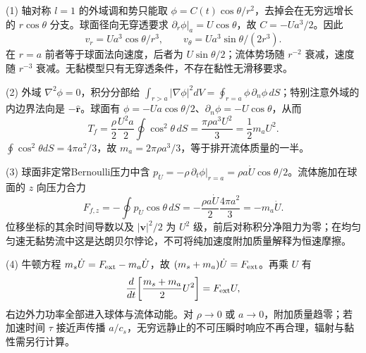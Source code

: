 (1) 轴对称 \(l=1\) 的外域调和势只能取 \(\phi=C(t)\cos\theta/r^2\)，去掉会在无穷远增长的 \(r\cos\theta\) 分支。球面径向无穿透要求 \(\partial_r\phi|_{a}=U\cos\theta\)，故 \(C=-Ua^3/2\)。因此
\[
v_r=Ua^3\cos\theta/r^3,\qquad v_\theta=Ua^3\sin\theta/(2r^3).
\]
在 \(r=a\) 前者等于球面法向速度，后者为 \(U\sin\theta/2\)；流体势场随 \(r^{-2}\) 衰减，速度随 \(r^{-3}\) 衰减。无黏模型只有无穿透条件，不存在黏性无滑移要求。

(2) 外域 \(\nabla^2\phi=0\)，积分分部给
\(\int_{r>a}|\nabla\phi|^2dV=\oint_{r=a}\phi\,\partial_n\phi\,dS\)；特别注意外域的内边界法向是 \(-\hat{\boldsymbol r}\)。球面有 \(\phi=-Ua\cos\theta/2\)、\(\partial_n\phi=-U\cos\theta\)，从而
\[
T_f=\frac\rho2\frac{U^2a}{2}\oint\cos^2\theta\,dS
=\frac{\pi\rho a^3U^2}{3}=\frac12m_aU^2.
\]
\(\oint\cos^2\theta dS=4\pi a^2/3\)，故 \(\boxed{m_a=2\pi\rho a^3/3}\)，等于排开流体质量的一半。

(3) 球面非定常Bernoulli压力中含 \(p_{\dot U}=-\rho\,\partial_t\phi|_{r=a}=\rho a\dot U\cos\theta/2\)。流体施加在球面的 \(z\) 向压力合力
\[
F_{f,z}=-\oint p_{\dot U}\cos\theta\,dS
=-\frac{\rho a\dot U}{2}\frac{4\pi a^2}{3}
=\boxed{-m_a\dot U}.
\]
位移坐标的其余时间导数以及 \(|\boldsymbol v|^2/2\) 为 \(U^2\) 级，前后对称积分净阻力为零；在均匀匀速无黏势流中这是达朗贝尔悖论，不可将纯加速度附加质量解释为恒速摩擦。

(4) 牛顿方程 \(m_s\dot U=F_{\rm ext}-m_a\dot U\)，故 \((m_s+m_a)\dot U=F_{\rm ext}\)。再乘 \(U\) 有
\[
\frac{d}{dt}\!\left[\frac{m_s+m_a}{2}U^2\right]=F_{\rm ext}U ,
\]
右边外力功率全部进入球体与流体动能。对 \(\rho\to0\) 或 \(a\to0\)，附加质量趋零；若加速时间 \(\tau\) 接近声传播 \(a/c_s\)，无穷远静止的不可压瞬时响应不再合理，辐射与黏性需另行计算。

